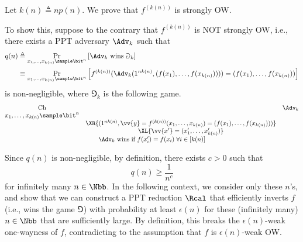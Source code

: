\begin{answer}[ii]
    Let $k(n)\triangleq np(n)$. We prove that $f^{(k(n))}$ is strongly OW.

    To show this, suppose to the contrary that $f^{(k(n))}$ is NOT strongly OW, i.e., there exists a PPT adversary $\Adv_{k}$ such that
    \begin{align*}
        q(n)
        &\triangleq\Pr_{x_1,\ldots,x_{k(n)}\sample \bit^{n}}\left[\Adv_{k} \textrm{ wins } \Game_k\right]\\
        &\equiv \Pr_{x_1,\ldots,x_{k(n)}\sample \bit^{n}}\left[ f^{(k(n))}(\Adv_k(1^{nk(n)}, (f(x_1),\ldots,f(x_{k(n)})))) = (f(x_1),\ldots,f(x_{k(n)})) \right]
    \end{align*}
    is non-negligible, where $\Game_k$ is the following game.
    {
        \[
            \begin{array}{@{} c c c @{}}
            \text{Ch} & & \Adv_k \\
            x_1,\ldots,x_{k(n)}\sample \bit^n & & \\
            & \XR{(1^{nk(n)}, \vv{y}=f^{(k(n))}(x_1,\ldots,x_{k(n)})=(f(x_1),\ldots,f(x_{k(n)})))} & \\
            & \XL{\vv{x'}=(x'_1, \ldots, x'_{k(n)})} & \\
            \multicolumn{3}{c}{\text{$\Adv_k$ wins if $f(x'_i)=f(x_i)\;\forall i\in[k(n)]$}}
            \end{array}
        \]
        \label{fig:p5-game1}
    }

    Since $q(n)$ is non-negligible, by definition, there exists $c\gt 0$ such that
    \begin{equation}\label{eq:p5-2-1}
        q(n)\ge \frac{1}{n^c}
    \end{equation}
    for infinitely many $n\in\Nbb$. In the following context, we consider only these $n$'s, and show that we can construct a PPT reduction $\Rcal$ that efficiently inverts $f$ (i.e., wins the game $\Game$) with probability at least $\epsilon(n)$ for these (infinitely many) $n\in\Nbb$ that are sufficiently large. By definition, this breaks the $\epsilon(n)$-weak one-wayness of $f$, contradicting to the assumption that $f$ is $\epsilon(n)$-weak OW.


\end{answer}
